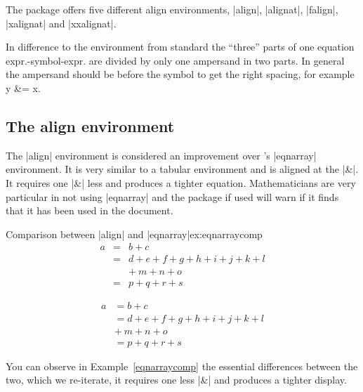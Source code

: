 {{{

The  package offers five different align environments, |align|, |alignat|, |falign|, |xalignat| and |xxalignat|. 

In difference to the  environment from standard \latex the ``three'' parts of one equation expr.-symbol-expr. are divided by only one ampersand in two parts. In general the ampersand should be before the symbol to get the right spacing, for example y \&= x. 

\subsection{The align environment}

The |align| environment is considered an improvement over \latex's |eqnarray| environment. It is very similar to a tabular
environment and is aligned at the |&|. 
It requires one |&| less and produces a tighter equation. Mathematicians 
are very particular in not using |eqnarray| and the package 
 if used will warn if it finds that it has been used in the document. 


\begin{texexample}{Comparison between |align| and |eqnarray|}{ex:eqnarraycomp}
\begin{eqnarray}
a & = & b + c \\
  & = & d + e + f + g + h + i
        + j + k + l \nonumber \\
  &   & +\: m + n + o \\
  & = & p + q + r + s
\end{eqnarray}

\begin{align}
a & =  b + c \\
  & =  d + e + f + g + h + i
       + j + k + l \nonumber \\
  & +\: m + n + o \\
  & =  p + q + r + s
\end{align}
\end{texexample}


You can observe in Example~\ref{eqnarraycomp} the essential differences between the two, which we re-iterate, it requires one less |&| and produces a tighter display.

}}}
